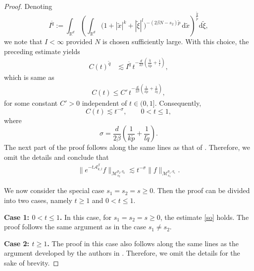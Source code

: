 \documentclass[12pt,reqno,a4paper]{amsart}
\numberwithin{equation}{section}
\theoremstyle{plain}
\theoremstyle{definition}
\theoremstyle{remark}
\begin{document}
\begin{proof}
Denoting
\[
I^{\widetilde{q}}
:=
\int_{\mathbb{R}^{d}}
\left(
\int_{\mathbb{R}^{d}}
\bigl(1+|\widetilde{x}|^{k}+|\widetilde{\xi}|^{l}\bigr)^{-(2\beta N-s_{2})\widetilde{p}}
\,\mathrm{d}\widetilde{x}
\right)^{\frac{\widetilde{q}}{\widetilde{p}}}
\mathrm{d}\widetilde{\xi},
\]
we note that \(I<\infty\) provided \(N\) is chosen sufficiently large. With this choice, the preceding estimate yields
\begin{align*}
C(t)^{\widetilde{q}}
\nonumber&\lesssim
I^{\widetilde{q}}\,
t^{-\frac{d}{2\beta }
\left(\frac{\widetilde{q}}{k\widetilde{p}}+\frac{1}{l}\right)}, 
\end{align*}
which is same as 
\begin{align}
\label{snot}
C(t)\le C'\,
t^{-\frac{d}{2\beta}
\left(\frac{1}{k\widetilde{p}}+\frac{1}{l\widetilde{q}}\right)},
\end{align}
for some constant $C'>0$ independent of $t\in(0,1]$. Consequently,
\[
C(t)
\lesssim
t^{-\sigma},
\qquad
0<t\le1,
\]
where
\[
\sigma
=
\frac{d}{2\beta}
\left(
\frac{1}{k\widetilde{p}}+\frac{1}{l\widetilde{q}}
\right).
\]
The next part of the proof follows along the same lines as that of \cite{dasgupta2026phase}. Therefore, we omit the details and conclude that
\begin{align}
\label{so}
\|e^{-t\mathcal{A}_{k,l}^{\beta}}f\|_{\mathcal{M}^{p_{2},q_{2}}_{s_{2}}}
\lesssim
t^{-\sigma}
\|f\|_{\mathcal{M}^{p_{1},q_{1}}_{s_{1}}}.
\end{align}



We now consider the special case $s_{1}=s_{2}=s\ge0$. Then the proof can be divided into two cases, namely $t\ge1$ and $0<t\le1$.

\medskip
\noindent
\textbf{Case 1: $0<t\leq 1$.}
In this case, for $s_{1}=s_{2}=s\ge 0$, the estimate \eqref{so} holds. The proof follows the same argument as in the case $s_{1}\neq s_{2}$.



\medskip
\noindent
\textbf{Case 2: \(t \geq 1\).} The proof in this case also follows along the same lines as the argument developed by the authors in \cite{dasgupta2026phase}. Therefore, we omit the details for the sake of brevity.

\end{proof}
\end{document}
